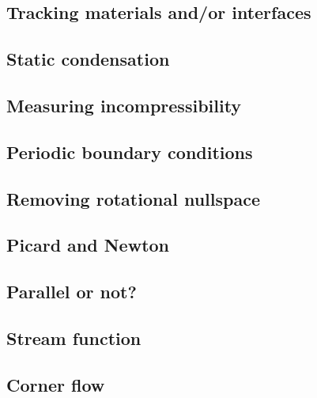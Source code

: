 \documentclass[a4paper]{article}
\begin{document}
\subsection{Tracking materials and/or interfaces}  %
\newpage %
\subsection{Static condensation}  %
\newpage %
\subsection{Measuring incompressibility \label{ss_incomp}}  %
\newpage %
\subsection{Periodic boundary conditions\label{ss_periodic}} %
\newpage %
\subsection{Removing rotational nullspace\label{ss_nullspace}} 
\newpage %
\subsection{Picard and Newton \label{ss_nonlinear}}  %
\newpage %
\subsection{Parallel or not?} \label{sec:parallel} 
\newpage %
\subsection{Stream function} \label{sec:streamfunction} 
\newpage %
\subsection{Corner flow} \label{sec:cornerflow} 
\end{document}
